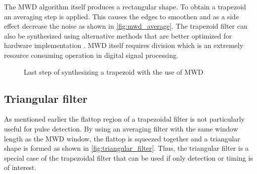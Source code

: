 The MWD algorithm itself produces a rectangular shape. To obtain a trapezoid
an averaging step is applied. This causes the edges to smoothen and as a 
side effect decrease the noise as shown in \autoref{fig:mwd_average}.
The trapezoid filter can also be synthesized using
alternative methods that are better optimized for hardware implementation
\cite{jordanov_trapezoidal}.
MWD itself requires division which is an extremely resource consuming operation 
in digital signal processing.
\begin{figure}[H]

  \caption{Last step of synthesizing a trapezoid with the use of MWD}
  \label{fig:mwd_average} 
\end{figure}

\subsection{Triangular filter}

As mentioned earlier the flattop region of a trapezoidal filter
is not particularly useful for pulse detection. By using an 
averaging filter with the same window length as the MWD window, 
the flattop is squeezed together and a triangular shape is formed
as shown in \autoref{fig:triangular_filter}.
Thus, the triangular filter is a special case of the 
trapezoidal filter that can be used if only detection or timing is of interest.

